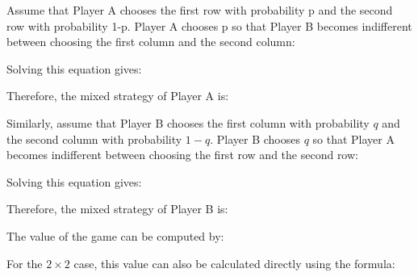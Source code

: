 \documentclass[12pt,a4paper]{article}
\begin{document}
Assume that Player A chooses the first row with probability p and the second row with probability 1-p. Player A chooses p so that Player B becomes indifferent between choosing the first column and the second column:

\noindent{}

Solving this equation gives:

\noindent{}

\vspace{0.15cm}
Therefore, the mixed strategy of Player A is:
\vspace{0.15cm}

\noindent{}

\vspace{0.15cm}
Similarly, assume that Player B chooses the first column with probability \(q\) and the second column with probability \(1-q\). Player B chooses \(q\) so that Player A becomes indifferent between choosing the first row and the second row:

\noindent{}

Solving this equation gives:

\noindent{}

\vspace{0.15cm}
Therefore, the mixed strategy of Player B is:
\vspace{0.1cm}

\noindent{}

The value of the game can be computed by:

\noindent{}

For the \(2 \times 2\) case, this value can also be calculated directly using the formula:
\vspace{0.1cm}
\end{document}
